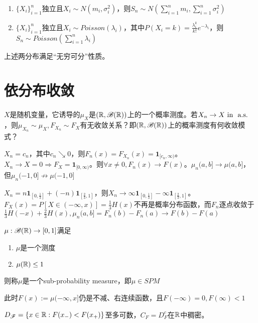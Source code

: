 \documentclass{ctexart}
\begin{document}
\begin{Rmk}
\begin{enumerate}
\item $\{X_{i}\}_{i=1}^{n}$独立且$X_{i}\sim N(m_{i},\sigma_{i}^{2})$，则$S_{n}\sim N(\sum\limits_{i=1}^{n} m_{i},\sum\limits_{i=1}^{n} \sigma_{i}^{2})$
\item $\{X_{i}\}_{i=1}^{n}$独立且$X_{i}\sim Poisson(\lambda_{i})$，其中$P(X_{i}=k)=\frac{\lambda^{k}_{i}}{k!}e^{-\lambda_{i}}$，则$S_{n}\sim Poisson(\sum\limits_{i=1}^{n}\lambda_{i})$
  \end{enumerate}
\end{Rmk}

上述两分布满足“无穷可分”性质。

\section{依分布收敛}
$X$是随机变量，它诱导的$\mu_{X}$是$(\mathbb{R},\mathscr{B}(\mathbb{R}))$上的一个概率测度。若$X_{n}\to X\text{ in } \text{ a.s. }$，则$\mu_{X_{n}}\sim \mu_{X},F_{X_{n}}\sim F_{X}$有无收敛关系？即$(\mathbb{R},\mathscr{B}(\mathbb{R}))$上的概率测度有何收敛模式？

\begin{Eg}
  $X_{n}=c_{n}$，其中$c_{n}\searrow 0$，则$F_{n}(x)=F_{X_{n}}(x)=\bm{1}_{[c_{n},\infty)}$。$X_{n}\to X=0\Rightarrow F_{X}=\bm{1}_{[0,\infty)}$。则$\forall x\neq 0, F_{n}(x)\to F(x)$。$\mu_{n}(a,b]\to \mu(a,b]$，但$\mu_{n}(-1,0]\not\to \mu(-1,0]$
\end{Eg}

\begin{Eg}
  $X_{n}=n\bm{1}_{[0,\frac{1}{3}]}+(-n)\bm{1}_{[\frac{2}{3},1]}$，则$X_{n}\to \infty \bm{1}_{[0,\frac 1 3]}-\infty\bm{1}_{[\frac{2}{3},1]}$。$F_{X}(x)=P[X\in (-\infty,x)]=\frac{1}{3}H(x)$不再是概率分布函数，而$F_{n}$逐点收敛于$\frac{1}{3}H(-x)+\frac{2}{3}H(x),\mu_{n}(a,b]=F_{n}(b)-F_{n}(a)\to F(b)-F(a)$
\end{Eg}

\begin{Def}[次概率分布]
  $\mu:\mathscr{B}(\mathbb{R})\to [0,1]$满足
  \begin{enumerate}
  \item $\mu$是一个测度
  \item $\mu(\mathbb{R})\leq 1$
  \end{enumerate}
  则称$\mu$是一个sub-probability measure，即$\mu\in SPM$

  此时$F(x):=\mu(-\infty,x]$仍是不减、右连续函数，且$F(-\infty)=0,F(\infty)<1$
\end{Def}
\begin{Rmk}
  $D_{\mathscr{F}}=\{x\in\mathbb{R}: F(x_{-})<F(x_{+})\}$至多可数，$C_{F}=D_{F}^{c}$在$\mathbb{R}$中稠密。
\end{Rmk}
\end{document}
